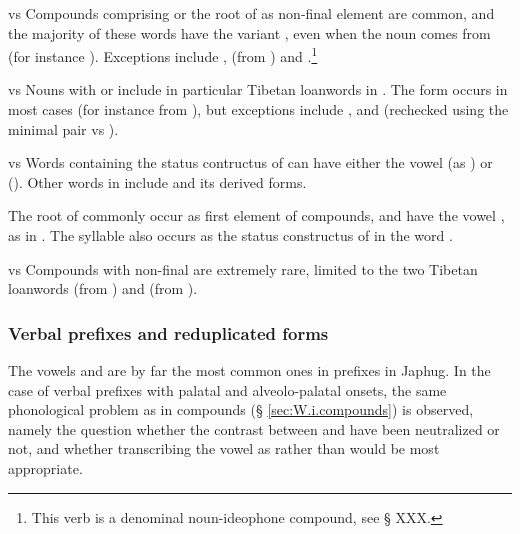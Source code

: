 \begin{paragraph}{ vs  }
Compounds comprising  or the root of  as non-final element are common, and the majority of these words have the variant , even when the noun comes from  (for instance ). Exceptions include ,  (from ) and .\footnote{This verb is a denominal noun-ideophone compound, see § XXX.}
\end{paragraph}
\begin{paragraph}{ vs  } \label{sec:compounds.chi.chW}
Nouns with  or  include in particular Tibetan loanwords in . The form  occurs in most cases (for instance  from ), but exceptions include ,  and  (rechecked using the minimal pair  vs ).
\end{paragraph}
\begin{paragraph}{ vs  }
Words containing the status contructus of  can have either the vowel  (as ) or  (). Other words in   include  and its derived forms.

The root of  commonly occur as first element of compounds, and have the vowel , as in . The syllable  also occurs as the status constructus of  in the word .

\end{paragraph}
\begin{paragraph}{ vs  } \label{sec:compounds.ji.jW}
Compounds with non-final   are extremely rare, limited to the two Tibetan loanwords  (from ) and  (from ).
\end{paragraph}
 

\subsubsection{Verbal prefixes and reduplicated forms}
The vowels  and  are by far the most common ones in prefixes in Japhug. In the case of verbal prefixes with palatal and alveolo-palatal onsets, the same phonological problem as in compounds (§ \ref{sec:W.i.compounds}) is observed, namely the question whether the contrast between  and  have been neutralized or not, and whether transcribing the vowel as  rather than  would be most appropriate.


